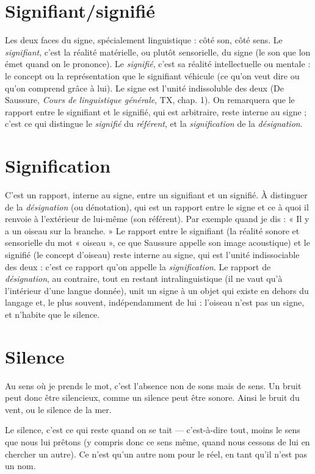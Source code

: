 \section{Signifiant/signifié}
Les deux faces du signe, spécialement linguistique :
côté son, côté sens. Le {\it signifiant}, c’est la réalité
matérielle, ou plutôt sensorielle, du signe (le son que lon émet quand on le
prononce). Le {\it signifié}, c’est sa réalité intellectuelle ou mentale : le concept ou la
représentation que le signifiant véhicule (ce qu’on veut dire ou qu'on comprend
grâce à lui). Le signe est l'unité indissoluble des deux (De Saussure,
{\it Cours de linguistique générale}, TX, chap. 1). On remarquera que le rapport entre
le signifiant et le signifié, qui est arbitraire, reste interne au signe ; c’est ce qui
distingue le {\it signifié} du {\it référent}, et la {\it signification} de la {\it désignation}.

\section{Signification}
C'est un rapport, interne au signe, entre un signifiant et
un signifié. À distinguer de la {\it désignation} (ou dénotation),
qui est un rapport entre le signe et ce à quoi il renvoie à l'extérieur de lui-même
(son référent). Par exemple quand je dis : « Il y a un oiseau sur la branche. » Le
rapport entre le signifiant (la réalité sonore et sensorielle du mot « oiseau », ce
que Saussure appelle son image acoustique) et le signifié (le concept d'oiseau)
reste interne au signe, qui est l’unité indissociable des deux : c’est ce rapport
qu’on appelle la {\it signification}. Le rapport de {\it désignation}, au contraire, tout en
restant intralinguistique (il ne vaut qu’à l’intérieur d’une langue donnée), unit
un signe à un objet qui existe en dehors du langage et, le plus souvent, indépendamment
de lui : l'oiseau n’est pas un signe, et n’habite que le silence.

\section{Silence}
Au sens où je prends le mot, c’est l’absence non de sons mais de
sens. Un bruit peut donc être silencieux, comme un silence peut
être sonore. Ainsi le bruit du vent, ou le silence de la mer.

Le silence, c’est ce qui reste quand on se tait — c’est-à-dire tout, moins le
sens que nous lui prêtons (y compris donc ce sens même, quand nous cessons
de lui en chercher un autre). Ce n’est qu’un autre nom pour le réel, en tant
qu’il n’est pas un nom.

